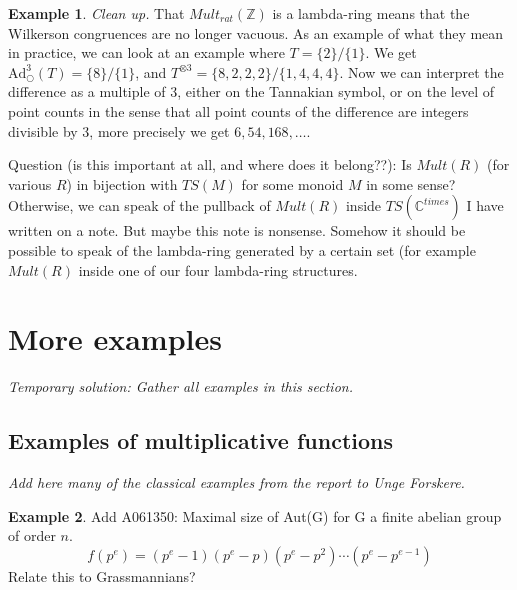 \documentclass[a4paper]{article}
\theoremstyle{definition}
\newtheorem{example}{Example}[section]
\theoremstyle{remark}
\newcommand{\adam}[1]{\text{Ad}^{#1}_{\bigcirc}}
\newcommand{\Z}{\mathbb{Z}}
\newcommand{\C}{\mathbb{C}}
\begin{document}
\begin{example}
\emph{Clean up.} That $Mult_{rat}(\Z)$ is a lambda-ring means that the Wilkerson congruences are no longer vacuous. As an example of what they mean in practice, we can look at an example where $T = \{   2 \}  /  \{ 1    \}$. We get $\adam{3}(T) = \{   8 \}  /  \{ 1    \}$, and $T^{\otimes 3} = \{   8, 2, 2, 2 \}  /  \{ 1, 4, 4, 4    \}$. Now we can interpret the difference as a multiple of 3, either on the Tannakian symbol, or on the level of point counts in the sense that all point counts of the difference are integers divisible by 3, more precisely we get $6, 54, 168, \ldots$.
\end{example}



Question (is this important at all, and where does it belong??): Is $Mult(R)$ (for various $R$) in bijection with $TS(M)$ for some monoid $M$ in some sense? Otherwise, we can speak of the pullback of $Mult(R)$ inside $TS(\C^{times})$ I have written on a note. But maybe this note is nonsense. Somehow it should be possible to speak of the lambda-ring generated by a certain set (for example $Mult(R)$ inside one of our four lambda-ring structures.

\section{More examples}

\emph{Temporary solution: Gather all examples in this section.}

\subsection{Examples of multiplicative functions}


\emph{Add here many of the classical examples from the report to Unge Forskere.}



\begin{example}
Add A061350: Maximal size of Aut(G) for G a finite abelian group of order $n$. 
$$  f(p^e) = (p^e-1)(p^e-p)(p^e-p^2)\cdots (p^e-p^{e-1})   $$
Relate this to Grassmannians?
\end{example}
\end{document}
